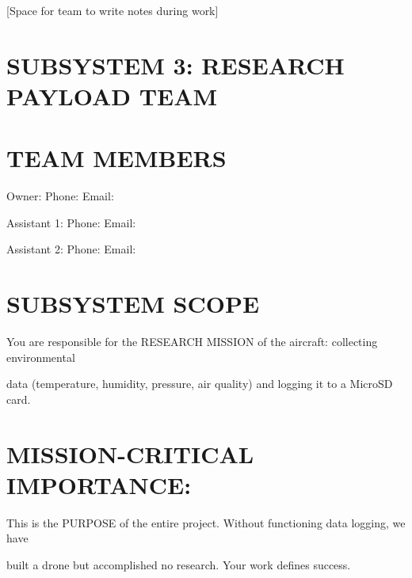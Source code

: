 \documentclass[11pt,letterpaper]{article}
\begin{document}
[Space for team to write notes during work]\par

\section{SUBSYSTEM 3: RESEARCH PAYLOAD TEAM}

\section{TEAM MEMBERS}

Owner:         \underline{\hspace{4.8cm}}  Phone: \underline{\hspace{1.7999999999999998cm}}  Email: \underline{\hspace{1.95cm}}\par

Assistant 1:   \underline{\hspace{4.8cm}}  Phone: \underline{\hspace{1.7999999999999998cm}}  Email: \underline{\hspace{1.95cm}}\par

Assistant 2:   \underline{\hspace{4.8cm}}  Phone: \underline{\hspace{1.7999999999999998cm}}  Email: \underline{\hspace{1.95cm}}\par

\section{SUBSYSTEM SCOPE}

You are responsible for the RESEARCH MISSION of the aircraft: collecting environmental\par

data (temperature, humidity, pressure, air quality) and logging it to a MicroSD card.\par

\section{MISSION-CRITICAL IMPORTANCE:}

This is the PURPOSE of the entire project. Without functioning data logging, we have\par

built a drone but accomplished no research. Your work defines success.\par
\end{document}
